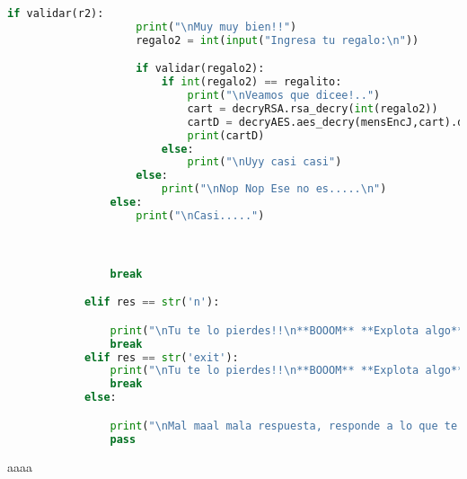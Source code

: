 \documentclass[a4paper, table,12pt,xcdraw]{article} %
\begin{document}
\begin{lstlisting}[language=python,caption=main]
				if validar(r2):
					print("\nMuy muy bien!!")
					regalo2 = int(input("Ingresa tu regalo:\n"))

					if validar(regalo2):
						if int(regalo2) == regalito:
							print("\nVeamos que dicee!..")
							cart = decryRSA.rsa_decry(int(regalo2))
							cartD = decryAES.aes_decry(mensEncJ,cart).decode()
							print(cartD)
						else:
							print("\nUyy casi casi")
					else:
						print("\nNop Nop Ese no es.....\n")
				else:
					print("\nCasi.....")



				break

			elif res == str('n'):

				print("\nTu te lo pierdes!!\n**BOOOM** **Explota algo**....")
				break
			elif res == str('exit'):
				print("\nTu te lo pierdes!!\n**BOOOM** **Explota algo**....")
				break
			else:

				print("\nMal maal mala respuesta, responde a lo que te digo bien:)")
				pass

	\end{lstlisting}

	\newpage
	\BgThispage
 aaaa
\end{document}
